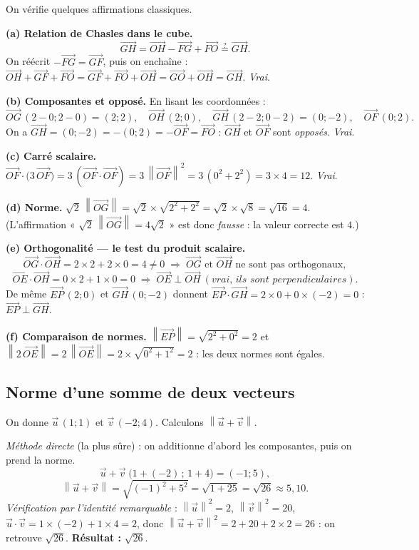 \documentclass[11pt,a4paper]{article}
\newcommand{\vc}[1]{\overrightarrow{#1}}        %
\providecommand{\norm}[1]{\left\lVert #1\right\rVert}
\begin{document}
\begin{exemple}
On vérifie quelques affirmations classiques.

\smallskip
\textbf{(a) Relation de Chasles dans le cube.}
\[
  \vc{GH}=\vc{OH}-\vc{FG}+\vc{FO}\overset{?}{=}\vc{GH}.
\]
On réécrit $-\vc{FG}=\vc{GF}$, puis on enchaîne :
$\vc{OH}+\vc{GF}+\vc{FO}=\vc{GF}+\vc{FO}+\vc{OH}=\vc{GO}+\vc{OH}=\vc{GH}$. \emph{Vrai}.

\smallskip
\textbf{(b) Composantes et opposé.} En lisant les coordonnées :
\[
  \vc{OG}\,(2-0;2-0)=(2;2),\quad
  \vc{OH}\,(2;0),\quad
  \vc{GH}\,(2-2;0-2)=(0;-2),\quad
  \vc{OF}\,(0;2).
\]
On a $\vc{GH}=(0;-2)=-(0;2)=-\vc{OF}=\vc{FO}$ : $\vc{GH}$ et $\vc{OF}$ sont \emph{opposés}. \emph{Vrai}.

\smallskip
\textbf{(c) Carré scalaire.} $\vc{OF}\cdot\bigl(3\,\vc{OF}\bigr)=3\,(\vc{OF}\cdot\vc{OF})=3\,\norm{\vc{OF}}^2
=3\,(0^2+2^2)=3\times4=12$. \emph{Vrai}.

\smallskip
\textbf{(d) Norme.} $\sqrt2\,\norm{\vc{OG}}=\sqrt2\times\sqrt{2^2+2^2}=\sqrt2\times\sqrt8=\sqrt{16}=4$.
(L'affirmation « $\sqrt2\,\norm{\vc{OG}}=4\sqrt2$ » est donc \emph{fausse} : la valeur correcte est $4$.)

\smallskip
\textbf{(e) Orthogonalité — le test du produit scalaire.}
\[
  \vc{OG}\cdot\vc{OH}=2\times2+2\times0=4\neq0 \;\Rightarrow\; \vc{OG}\text{ et }\vc{OH}\text{ ne sont pas orthogonaux},
\]
\[
  \vc{OE}\cdot\vc{OH}=0\times2+1\times0=0 \;\Rightarrow\; \vc{OE}\perp\vc{OH}\ (\textit{vrai, ils sont perpendiculaires}).
\]
De même $\vc{EP}\,(2;0)$ et $\vc{GH}\,(0;-2)$ donnent $\vc{EP}\cdot\vc{GH}=2\times0+0\times(-2)=0$ :
$\vc{EP}\perp\vc{GH}$.

\smallskip
\textbf{(f) Comparaison de normes.}
$\norm{\vc{EP}}=\sqrt{2^2+0^2}=2$ et $\norm{2\,\vc{OE}}=2\,\norm{\vc{OE}}=2\times\sqrt{0^2+1^2}=2$ :
les deux normes sont égales.
\end{exemple}

\subsection{Norme d'une somme de deux vecteurs}

\begin{exemple}[calculer $\norm{\vec{u}+\vec{v}}$]
On donne $\vec{u}\,(1;1)$ et $\vec{v}\,(-2;4)$. Calculons $\norm{\vec{u}+\vec{v}}$.

\emph{Méthode directe} (la plus sûre) : on additionne d'abord les composantes, puis on prend la norme.
\[
  \vec{u}+\vec{v}\;\bigl(1+(-2)\,;\,1+4\bigr)=(-1;5),
\]
\[
  \norm{\vec{u}+\vec{v}}=\sqrt{(-1)^2+5^2}=\sqrt{1+25}=\sqrt{26}\approx 5{,}10 .
\]
\emph{Vérification par l'identité remarquable} : $\norm{\vec u}^2=2$, $\norm{\vec v}^2=20$,
$\vec u\cdot\vec v=1\times(-2)+1\times4=2$, donc
$\norm{\vec u+\vec v}^2=2+20+2\times2=26$ : on retrouve $\sqrt{26}$. \quad\textbf{Résultat : }$\sqrt{26}$.
\end{exemple}
\end{document}
